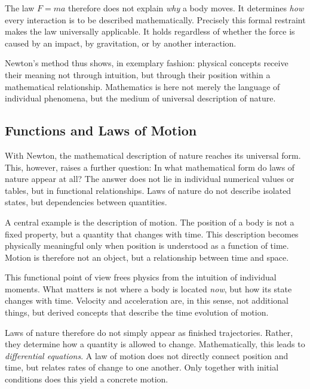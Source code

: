 The law \(F = m a\) therefore does not explain
\emph{why} a body moves.
It determines
\emph{how} every interaction
is to be described mathematically.
Precisely this formal restraint
makes the law universally applicable.
It holds regardless of whether the force is caused
by an impact,
by gravitation,
or by another interaction.

Newton's method thus shows, in exemplary fashion:
physical concepts receive their meaning
not through intuition,
but through their position within a mathematical relationship.
Mathematics
is here not merely the language of individual phenomena,
but the medium of universal description of nature.

\subsection{Functions and Laws of Motion}

With Newton, the mathematical description of nature reaches its universal form.
This, however, raises a further question:
In what mathematical form do laws of nature appear at all?
The answer does not lie in individual numerical values or tables,
but in functional relationships.
Laws of nature do not describe isolated states,
but dependencies between quantities.

A central example is the description of motion.
The position of a body is not a fixed property,
but a quantity that changes with time.
This description becomes physically meaningful only
when position is understood as a function of time.
Motion is therefore not an object,
but a relationship between time and space.

This functional point of view frees physics
from the intuition of individual moments.
What matters is not
where a body is located \emph{now},
but how its state changes with time.
Velocity
and acceleration
are, in this sense, not additional things,
but derived concepts
that describe the time evolution of motion.

Laws of nature therefore do not simply appear
as finished trajectories.
Rather, they determine
how a quantity is allowed to change.
Mathematically, this leads to \emph{differential equations}.
A law of motion
does not directly connect position and time,
but relates rates of change to one another.
Only together with initial conditions
does this yield a concrete motion.

